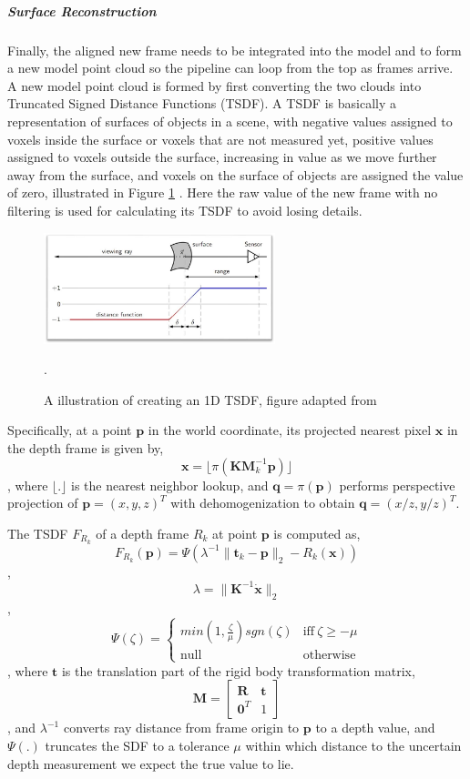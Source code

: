 \subparagraph{Surface Reconstruction}
Finally, the aligned new frame needs to be integrated into the model and to form a new model point cloud so the pipeline can loop from the top as frames arrive.  A new model point cloud is formed by first converting the two clouds into Truncated Signed Distance Functions (TSDF).  A TSDF is basically a representation of surfaces of objects in a scene, with negative values assigned to voxels inside the surface or voxels that are not measured yet, positive values assigned to voxels outside the surface, increasing in value as we move further away from the surface, and voxels on the surface of objects are assigned the value of zero, illustrated in Figure \ref{fig:TSDF} \cite{newcombe2011kinectfusion}.  Here the raw value of the new frame with no filtering is used for calculating its TSDF to avoid losing details.
\begin{figure} [h]
	\centering
	\includegraphics[width=0.6\textwidth]{./img/TSDF.jpg}
	\caption{A illustration of creating an 1D TSDF, figure adapted from \cite{pirovano2011kinfu}}.
	\label{fig:TSDF}
\end{figure}

Specifically, at a point \(\textbf{p}\) in the world coordinate, its projected nearest pixel \(\textbf{x}\) in the depth frame is given by,
\[  \textbf{x} = \lfloor \pi (\textbf{K} \textbf{M}^{-1}_{k} \textbf{p}) \rfloor  \]
, where \( \lfloor.\rfloor \) is the nearest neighbor lookup, and \( \textbf{q} = \pi(\textbf{p}) \) performs perspective projection of \(\textbf{p} = (x,y,z)^T\) with dehomogenization to obtain \(\textbf{q} = (x/z, y/z)^T\).

The TSDF \(F_{R_k}\) of a depth frame \(R_k\) at point \(\textbf{p}\) is computed as,
\[  F_{R_k}(\textbf{p}) = \Psi(\lambda^{-1}\|\textbf{t}_k - \textbf{p}\|_2 - R_k(\textbf{x}))  \]
, \[  \lambda = \|\textbf{K}^{-1} \dot{\textbf{x}} \|_2   \]
, 
\[
\Psi(\zeta) = 
\begin{cases}
min(1, \frac{\zeta}{\mu}) sgn(\zeta)  & \text{iff}\ \zeta \geq -\mu \\
\text{null} & \text{otherwise}
\end{cases}
\]
, where \(\textbf{t}\) is the translation part of the rigid body transformation matrix,
\[  \textbf{M} = 
\begin{bmatrix}
\textbf{R}		&	\textbf{t} \\
\textbf{0}^T	&	1
\end{bmatrix}  \]
, and \(\lambda^{-1}\) converts ray distance from frame origin to \(\textbf{p}\) to a depth value, and \(\Psi(.)\) truncates the SDF to a tolerance \(\mu\) within which distance to the uncertain depth measurement we expect the true value to lie.

